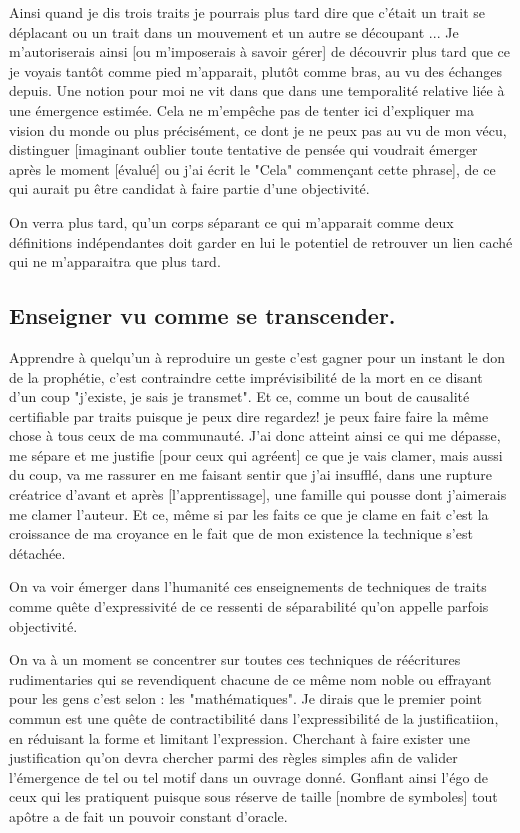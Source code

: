 \documentclass{article}
\begin{document}
 Ainsi quand je dis trois traits je pourrais plus tard dire que c'était un trait se déplacant ou  un trait dans un mouvement et un autre se découpant ... Je m'autoriserais ainsi [ou m'imposerais à savoir gérer] de découvrir plus tard que ce je voyais tantôt comme pied m'apparait, plutôt comme bras, au vu des échanges depuis. Une notion pour moi ne vit dans que dans une temporalité relative liée à une émergence estimée. 
  Cela ne m'empêche pas de tenter ici d'expliquer ma vision du monde ou plus précisément, ce dont je ne peux pas au vu de mon vécu, distinguer [imaginant oublier toute tentative de pensée qui voudrait émerger après le moment [évalué] ou j'ai écrit le "Cela" commençant cette phrase],  de ce qui aurait pu être candidat à faire partie d'une objectivité. 
 
 On verra plus tard, qu'un corps séparant ce qui m'apparait comme deux définitions indépendantes doit garder en lui le potentiel de retrouver un lien caché qui ne m'apparaitra que plus tard.
  
  \subsection{Enseigner vu comme se transcender.}%
  Apprendre à quelqu'un à  reproduire un geste c'est  gagner pour un instant le don de la prophétie, c'est contraindre cette imprévisibilité de la mort en ce disant 
  d'un coup "j'existe, je sais je transmet". Et ce,  comme un bout de causalité certifiable par traits  puisque je peux dire regardez! je peux faire faire la même chose à tous ceux de ma communauté.  J'ai donc atteint  ainsi ce qui me dépasse, me sépare et me justifie  [pour ceux qui agréent] ce que je vais clamer, mais aussi du coup, va me rassurer en me faisant sentir que j'ai insufflé, dans une rupture créatrice  d'avant et après [l'apprentissage], une famille qui pousse dont j'aimerais me clamer l'auteur. Et ce,  même si par les faits  ce que je clame en fait c'est la croissance de ma croyance en le fait que de mon existence la technique s'est détachée.
   
   On va voir émerger dans l'humanité ces enseignements de techniques de traits comme quête d'expressivité de ce ressenti de séparabilité qu'on appelle parfois objectivité.
   
   On va à un moment se concentrer sur toutes ces techniques de réécritures  rudimentaries qui se revendiquent  chacune de ce même nom noble ou effrayant 
   pour les gens c'est selon : les "mathématiques".  Je dirais que le premier point commun est une quête de contractibilité dans l'expressibilité de la justificatiion, en réduisant la forme et limitant l'expression. Cherchant à faire  exister une justification qu'on devra chercher parmi des règles simples afin de valider l'émergence de tel ou tel motif dans un ouvrage donné. Gonflant ainsi l'égo de ceux qui les pratiquent puisque   sous réserve de taille [nombre de symboles] tout apôtre a de fait  un pouvoir constant d'oracle.
   
\end{document}
